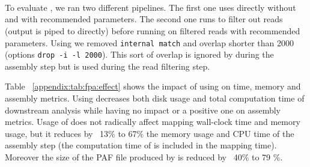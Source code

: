 \documentclass[../../main.tex]{subfiles}
\begin{document}
\newpage
~


\newpage
\section{\fpa}\label{appendix:sec:fpa}

To evaluate \fpa, we ran two different pipelines. The first one uses directly \miniasm without \fpa and with recommended parameters. The second one runs \fpa to filter out reads (\minimap output is piped to \fpa directly) before running \miniasm on filtered reads with recommended parameters. Using \fpa we removed \texttt{internal match} and overlap shorter than 2000 (options \texttt{drop -i -l 2000}). This sort of overlap is ignored by \miniasm during the assembly step but is used during the read filtering step.

Table ~\ref{appendix:tab:fpa:effect} shows the impact of using \fpa on time, memory and assembly metrics.
Using \fpa decreases both disk usage and total computation time of downstream analysis while having no impact or a positive one on assembly metrics.
Usage of \fpa does not radically affect mapping wall-clock time and memory usage, but it reduces by ~13\% to 67\% the memory usage and CPU time of the assembly step (the computation time of \fpa is included in the mapping time). Moreover the size of the PAF file produced by \minimap is reduced by ~40\% to 79 \%.  
\end{document}
